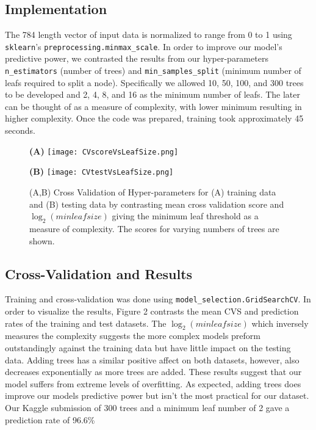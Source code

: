 \documentclass{article}
\begin{document}
\subsection{Implementation}
The 784 length vector of input data is normalized to range from 0 to 1 using \verb+sklearn+'s \verb+preprocessing.minmax_scale+. In order to improve our model's predictive power, we contrasted the results from our hyper-parameters \verb+n_estimators+ (number of trees) and  \verb+min_samples_split+ (minimum number of leafs required to split a node). Specifically we allowed 10, 50, 100, and 300 trees to be developed and 2, 4, 8, and 16 as the minimum number of leafs. The later can be thought of as a measure of complexity, with lower minimum resulting in higher complexity. Once the code was prepared, training took approximately 45 seconds. 
\begin{figure}[h]
    \centering
    \begin{minipage}[t]{0.45\textwidth}
        \centering
        \textbf{(A)}
        \texttt{[image: CVscoreVsLeafSize.png]}
    \end{minipage}
    \begin{minipage}[t]{0.45\textwidth}
        \centering
        \textbf{(B)}
        \texttt{[image: CVtestVsLeafSize.png]}
    \end{minipage}
\caption{(A,B) Cross Validation of Hyper-parameters for (A) training data and (B) testing data by contrasting mean cross validation score and $\log_2(minleafsize)$ giving the minimum leaf threshold as a measure of complexity. The scores for varying numbers of trees are shown.}
\end{figure}

\subsection{Cross-Validation and Results}
Training and cross-validation was done using \verb+model_selection.GridSearchCV+. In order to visualize the results, Figure 2 contrasts the mean CVS and prediction rates of the training and test datasets. The $\log_2(minleafsize)$ which inversely measures the complexity suggests the more complex models preform outstandingly against the training data but have little impact on the testing data. Adding trees has a similar positive affect on both datasets, however, also decreases exponentially as more trees are added. These results suggest that our model suffers from extreme levels of overfitting. As expected, adding trees does improve our models predictive power but isn't the most practical for our dataset. Our Kaggle submission of 300 trees and a minimum leaf number of 2 gave a prediction rate of 96.6\%
\end{document}
